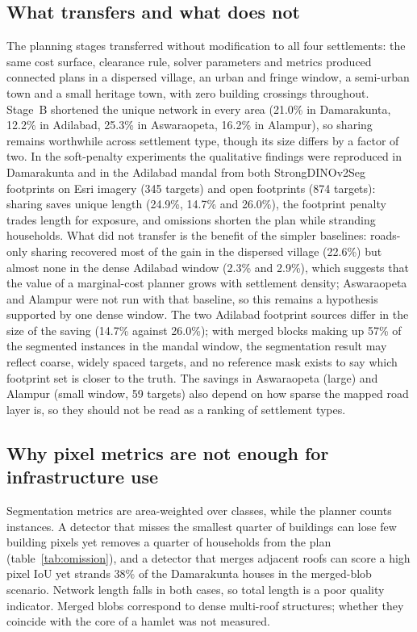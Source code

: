 \documentclass[12pt,a4paper]{article}
\newcommand{\dinoseg}{StrongDINOv2Seg}
\begin{document}
\subsection{What transfers and what does not}
The planning stages transferred without modification to all four settlements: the same cost surface, clearance rule, solver parameters and metrics produced connected plans in a dispersed village, an urban and fringe window, a semi-urban town and a small heritage town, with zero building crossings throughout. Stage~B shortened the unique network in every area (21.0\% in Damarakunta, 12.2\% in Adilabad, 25.3\% in Aswaraopeta, 16.2\% in Alampur), so sharing remains worthwhile across settlement type, though its size differs by a factor of two. In the soft-penalty experiments the qualitative findings were reproduced in Damarakunta and in the Adilabad mandal from both \dinoseg{} footprints on Esri imagery (345 targets) and open footprints (874 targets): sharing saves unique length (24.9\%, 14.7\% and 26.0\%), the footprint penalty trades length for exposure, and omissions shorten the plan while stranding households. What did not transfer is the benefit of the simpler baselines: roads-only sharing recovered most of the gain in the dispersed village (22.6\%) but almost none in the dense Adilabad window (2.3\% and 2.9\%), which suggests that the value of a marginal-cost planner grows with settlement density; Aswaraopeta and Alampur were not run with that baseline, so this remains a hypothesis supported by one dense window. The two Adilabad footprint sources differ in the size of the saving (14.7\% against 26.0\%); with merged blocks making up 57\% of the segmented instances in the mandal window, the segmentation result may reflect coarse, widely spaced targets, and no reference mask exists to say which footprint set is closer to the truth. The savings in Aswaraopeta (large) and Alampur (small window, 59 targets) also depend on how sparse the mapped road layer is, so they should not be read as a ranking of settlement types.

\subsection{Why pixel metrics are not enough for infrastructure use}
Segmentation metrics are area-weighted over classes, while the planner counts instances. A detector that misses the smallest quarter of buildings can lose few building pixels yet removes a quarter of households from the plan (table~\ref{tab:omission}), and a detector that merges adjacent roofs can score a high pixel IoU yet strands 38\% of the Damarakunta houses in the merged-blob scenario. Network length falls in both cases, so total length is a poor quality indicator. Merged blobs correspond to dense multi-roof structures; whether they coincide with the core of a hamlet was not measured.
\end{document}
